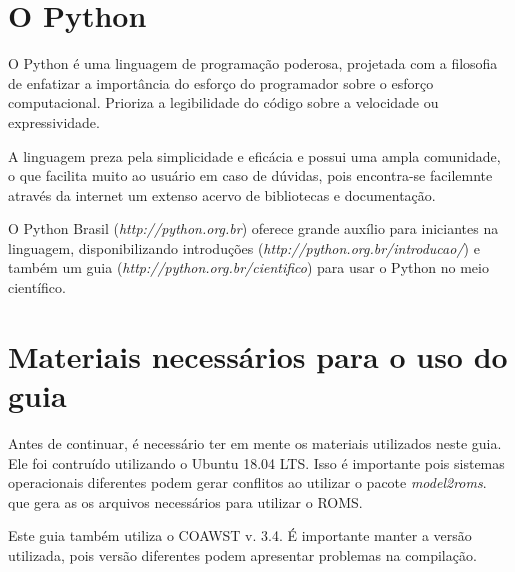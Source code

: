 \section{O Python}
\bigskip

\noindent O Python é uma linguagem de programação poderosa, projetada com a filosofia de enfatizar a importância do esforço do programador sobre o esforço computacional. Prioriza a legibilidade do código sobre a velocidade ou expressividade.
\bigskip

\noindent A linguagem preza pela simplicidade e eficácia e possui uma ampla comunidade, o que facilita muito ao usuário em caso de dúvidas, pois encontra-se facilemnte através da internet um extenso acervo de bibliotecas e documentação.
\bigskip

\noindent O Python Brasil (\textcolor{bleu_cite}{\textit{http://python.org.br}}) oferece grande auxílio para iniciantes na linguagem, disponibilizando introduções (\textcolor{bleu_cite}{\textit{http://python.org.br/introducao/}}) e também um guia (\textcolor{bleu_cite}{\textit{http://python.org.br/cientifico}}) para usar o Python no meio científico.



\section{Materiais necessários para o uso do guia}
\bigskip

\noindent Antes de continuar, é necessário ter em mente os materiais utilizados neste guia. Ele foi contruído  utilizando o Ubuntu 18.04 LTS. Isso é importante pois sistemas operacionais diferentes podem gerar conflitos ao utilizar o pacote \textit{model2roms}. que gera as os arquivos necessários para utilizar o ROMS.
\bigskip

\noindent Este guia também utiliza o COAWST v. 3.4. É importante manter a versão utilizada, pois versão diferentes podem apresentar problemas na compilação.

